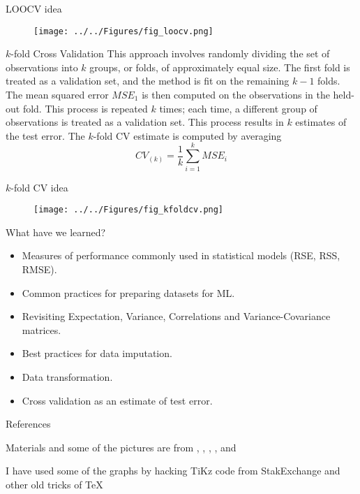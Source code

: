 \documentclass{beamer}
\begin{document}
\begin{frame}{LOOCV idea}
	\begin{figure}
		\centering
		\texttt{[image: ../../Figures/fig\_loocv.png]}
	\end{figure}	
\end{frame}


\begin{frame}{$k$-fold Cross Validation}
	This approach involves randomly dividing the set of observations into $k$ groups, or folds, of approximately equal size. The first fold is treated as a validation set, and the method is fit on the remaining $k-1$ folds. The mean squared error $MSE_1$ is then computed on the observations in the held-out fold. This process is repeated $k$ times; each time, a different group of observations is treated as a validation set. This process results in $k$ estimates of the test error. The $k$-fold CV estimate is computed by averaging 
	\begin{equation*}
		CV_{(k)}=\frac 1k \sum_{i=1}^k MSE_i
	\end{equation*}
\end{frame}

\begin{frame}{$k$-fold CV idea}
	\begin{figure}
		\centering
		\texttt{[image: ../../Figures/fig\_kfoldcv.png]}
	\end{figure}	
\end{frame}

\begin{frame}{What have we learned?}
	\begin{itemize}
		\item Measures of performance commonly used in statistical models (RSE, RSS, RMSE).
		\item Common practices for preparing datasets for ML.
		\item Revisiting Expectation, Variance, Correlations and Variance-Covariance matrices.
		\item Best practices for data imputation.
		\item Data transformation.
		\item Cross validation as an estimate of test error. 
		
	\end{itemize}
\end{frame}


\begin{frame}{References}
	

Materials and some of the pictures are from \citep{James2015}, \citep{hastie01}, \citep{harrell}, \citep{kleinbaum}, and \citep{pestman}

\printbibliography 




I have used some of the graphs by hacking TiKz code from StakExchange and other old tricks of \TeX
\end{frame}		
\end{document}
